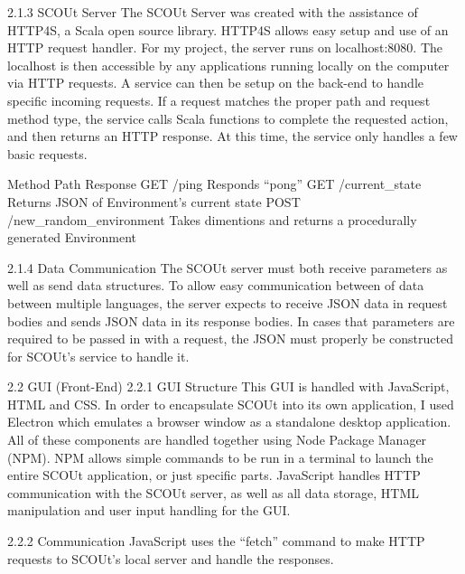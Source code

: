2.1.3 SCOUt Server
The SCOUt Server was created with the assistance of HTTP4S, a Scala open source library.
HTTP4S allows easy setup and use of an HTTP request handler. For my project, the server runs on localhost:8080.
The localhost is then accessible by any applications running locally on the computer via HTTP requests.
A service can then be setup on the back-end to handle specific incoming requests.
If a request matches the proper path and request method type, the service calls Scala functions to complete the requested action, and then returns an HTTP response.
At this time, the service only handles a few basic requests.

Method	Path	Response
GET	/ping	Responds “pong”
GET	/current_state	Returns JSON of Environment’s current state
POST	/new_random_environment	Takes dimentions and returns a procedurally generated Environment

2.1.4 Data Communication
The SCOUt server must both receive parameters as well as send data structures.
To allow easy communication between of data between multiple languages, the server expects to receive JSON data in request bodies and sends JSON data in its response bodies.
In cases that parameters are required to be passed in with a request, the JSON must properly be constructed for SCOUt’s service to handle it.

2.2 GUI (Front-End)
2.2.1 GUI Structure
This GUI is handled with JavaScript, HTML and CSS.
In order to encapsulate SCOUt into its own application, I used Electron which emulates a browser window as a standalone desktop application.
All of these components are handled together using Node Package Manager (NPM).
NPM allows simple commands to be run in a terminal to launch the entire SCOUt application, or just specific parts.
JavaScript handles HTTP communication with the SCOUt server, as well as all data storage, HTML manipulation and user input handling for the GUI.

2.2.2 Communication
JavaScript uses the “fetch” command to make HTTP requests to SCOUt’s local server and handle the responses.

